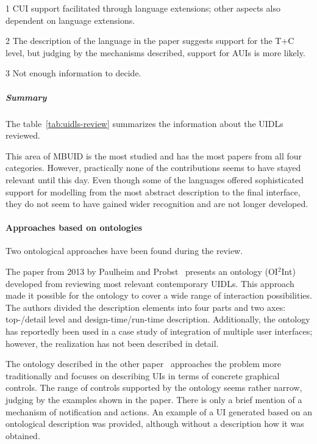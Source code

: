 \begin{table}[]
\begin{threeparttable}[b]
\begin{tabularx}{\textwidth}{lrCCC}
            \bottomrule
        \end{tabularx}
        \begin{tablenotes}
            \item[1] CUI support facilitated through language extensions;
                     other aspects also dependent on language extensions.
            \item[2] The description of the language in the paper suggests support for the T+C level, but judging by the mechanisms described, support for AUIs is more likely.
            \item[3] Not enough information to decide.
        \end{tablenotes}
    \end{threeparttable}
\end{table}

\subparagraph{Summary}
The table~\ref{tab:uidls-review} summarizes the information about the UIDLs reviewed.

This area of MBUID is the most studied and has the most papers from all four categories.
However, practically none of the contributions seems to have stayed relevant until this day.
Even though some of the languages offered sophisticated support for modelling from the most abstract description to the final interface, they do not seem to have gained wider recognition and are not longer developed.

\paragraph{Approaches based on ontologies}

Two ontological approaches have been found during the review.

The paper from 2013 by Paulheim and Probst~\cite{paulheim_ui2ont_2013} presents an ontology (OI$^{2}$Int) developed from reviewing most relevant contemporary UIDLs.
This approach made it possible for the ontology to cover a wide range of interaction possibilities.
The authors divided the description elements into four parts and two axes: top-/detail level and design-time/run-time description.
Additionally, the ontology has reportedly been used in a case study of integration of multiple user interfaces;
however, the realization has not been described in detail.

The ontology described in the other paper~\cite{wysota_semantic_2015} approaches the problem more traditionally and focuses on describing UIs in terms of concrete graphical controls.
The range of controls supported by the ontology seems rather narrow, judging by the examples shown in the paper.
There is only a brief mention of a mechanism of notification and actions.
An example of a UI generated based on an ontological description was provided, although without a description how it was obtained.


